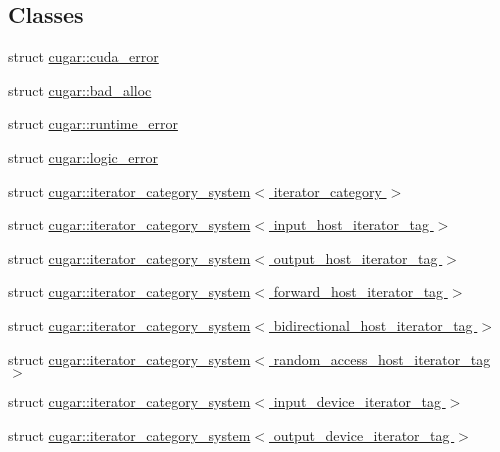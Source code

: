 \subsection*{Classes}
\begin{DoxyCompactItemize}
\item 
struct \hyperlink{structcugar_1_1cuda__error}{cugar\+::cuda\+\_\+error}
\item 
struct \hyperlink{structcugar_1_1bad__alloc}{cugar\+::bad\+\_\+alloc}
\item 
struct \hyperlink{structcugar_1_1runtime__error}{cugar\+::runtime\+\_\+error}
\item 
struct \hyperlink{structcugar_1_1logic__error}{cugar\+::logic\+\_\+error}
\item 
struct \hyperlink{structcugar_1_1iterator__category__system}{cugar\+::iterator\+\_\+category\+\_\+system$<$ iterator\+\_\+category $>$}
\item 
struct \hyperlink{structcugar_1_1iterator__category__system_3_01input__host__iterator__tag_01_4}{cugar\+::iterator\+\_\+category\+\_\+system$<$ input\+\_\+host\+\_\+iterator\+\_\+tag $>$}
\item 
struct \hyperlink{structcugar_1_1iterator__category__system_3_01output__host__iterator__tag_01_4}{cugar\+::iterator\+\_\+category\+\_\+system$<$ output\+\_\+host\+\_\+iterator\+\_\+tag $>$}
\item 
struct \hyperlink{structcugar_1_1iterator__category__system_3_01forward__host__iterator__tag_01_4}{cugar\+::iterator\+\_\+category\+\_\+system$<$ forward\+\_\+host\+\_\+iterator\+\_\+tag $>$}
\item 
struct \hyperlink{structcugar_1_1iterator__category__system_3_01bidirectional__host__iterator__tag_01_4}{cugar\+::iterator\+\_\+category\+\_\+system$<$ bidirectional\+\_\+host\+\_\+iterator\+\_\+tag $>$}
\item 
struct \hyperlink{structcugar_1_1iterator__category__system_3_01random__access__host__iterator__tag_01_4}{cugar\+::iterator\+\_\+category\+\_\+system$<$ random\+\_\+access\+\_\+host\+\_\+iterator\+\_\+tag $>$}
\item 
struct \hyperlink{structcugar_1_1iterator__category__system_3_01input__device__iterator__tag_01_4}{cugar\+::iterator\+\_\+category\+\_\+system$<$ input\+\_\+device\+\_\+iterator\+\_\+tag $>$}
\item 
struct \hyperlink{structcugar_1_1iterator__category__system_3_01output__device__iterator__tag_01_4}{cugar\+::iterator\+\_\+category\+\_\+system$<$ output\+\_\+device\+\_\+iterator\+\_\+tag $>$}

\end{DoxyCompactItemize}
